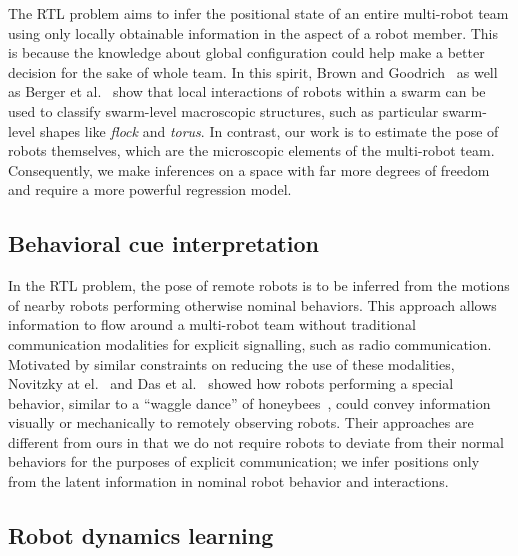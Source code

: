 \documentclass[letterpaper, 10 pt, conference]{ieeeconf}  %
\begin{document}
    The RTL problem aims to infer the positional state of an entire
    multi-robot team using only locally obtainable information in the
    aspect of a robot member. This is because the knowledge about global
    configuration could help make a better decision for the sake of
    whole team. In this spirit, Brown and Goodrich~\cite{BG14} as well
    as Berger et al.~\cite{BSB16} show that local interactions of robots
    within a swarm can be used to classify swarm-level macroscopic
    structures, such as particular swarm-level shapes like \emph{flock}
    and \emph{torus}. In contrast, our work is to estimate the pose of
    robots themselves, which are the microscopic elements of the
    multi-robot team. Consequently, we make inferences on a space with
    far more degrees of freedom and require a more powerful regression
    model.

	\subsection{Behavioral cue interpretation}
	\label{sec:behavioral_cue_interpretation}

    In the RTL problem, the pose of remote robots is to be inferred from
    the motions of nearby robots performing otherwise nominal behaviors.
    This approach allows information to flow around a multi-robot team
    without traditional communication modalities for explicit
    signalling, such as radio communication. Motivated by similar
    constraints on reducing the use of these modalities, Novitzky at
    el.~\cite{NPCBW12} and Das et al.~\cite{DCV16} showed how robots
    performing a special behavior, similar to a ``waggle dance'' of
    honeybees~\cite{VonFrisch67}, could convey information visually or
    mechanically to remotely observing robots. Their approaches are
    different from ours in that we do not require robots to deviate from
    their normal behaviors for the purposes of explicit communication;
    we infer positions only from the latent information in nominal robot
    behavior and interactions.

	\subsection{Robot dynamics learning}
	\label{sec:robot_dynamics_learning}
\end{document}
